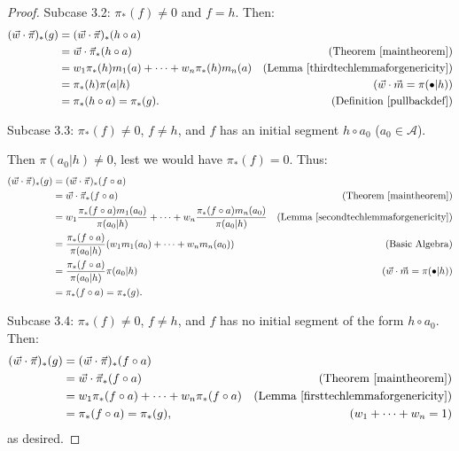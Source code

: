 \documentclass{article}
\begin{document}
\begin{proof}
    Subcase 3.2: $\pi_*(f)\not=0$ and $f=h$. Then:
    \begin{align*}
        (\vec w\cdot\vec\pi)_*(g)
            &= (\vec w\cdot\vec\pi)_*(h\circ a)\\
            &= \vec w\cdot\vec\pi_*(h\circ a)
                    &\mbox{(Theorem \ref{maintheorem})}\\
            &= w_1\pi_*(h)m_1(a)+\cdots+w_n\pi_*(h)m_n(a)
                    &\mbox{(Lemma \ref{thirdtechlemmaforgenericity})}\\
            &= \pi_*(h)\pi(a|h)
                    &\mbox{($\vec w\cdot\vec m=\pi(\bullet|h)$)}\\
            &= \pi_*(h\circ a) = \pi_*(g).
                    &\mbox{(Definition \ref{pullbackdef})}
    \end{align*}

    Subcase 3.3: $\pi_*(f)\not=0$, $f\not=h$, and
    $f$ has an initial segment $h\circ a_0$ ($a_0\in\mathcal A$).

    Then $\pi(a_0|h)\not=0$, lest
    we would have $\pi_*(f)=0$. Thus:
    \begin{align*}
        (\vec w\cdot\vec\pi)_*(g)
            &= (\vec w\cdot \vec\pi)_*(f\circ a)\\
            &= \vec w\cdot\vec\pi_*(f\circ a)
                    &\mbox{(Theorem \ref{maintheorem})}\\
            &= w_1\frac{\pi_*(f\circ a)m_1(a_0)}{\pi(a_0|h)}
                +\cdots+w_n\frac{\pi_*(f\circ a)m_n(a_0)}{\pi(a_0|h)}
                    &\mbox{(Lemma \ref{secondtechlemmaforgenericity})}\\
            &= \frac{\pi_*(f\circ a)}{\pi(a_0|h)}(w_1m_1(a_0)+\cdots+w_nm_n(a_0))
                    &\mbox{(Basic Algebra)}\\
            &= \frac{\pi_*(f\circ a)}{\pi(a_0|h)}\pi(a_0|h)
                    &\mbox{($\vec w\cdot\vec m=\pi(\bullet|h)$)}\\
            &= \pi_*(f\circ a) = \pi_*(g).
    \end{align*}

    Subcase 3.4: $\pi_*(f)\not=0$, $f\not=h$, and $f$ has no initial segment
        of the form $h\circ a_0$. Then:
    \begin{align*}
        (\vec w\cdot\vec\pi)_*(g)
            &= (\vec w\cdot\vec\pi)_*(f\circ a)\\
            &= \vec w\cdot\vec\pi_*(f\circ a)
                    &\mbox{(Theorem \ref{maintheorem})}\\
            &= w_1\pi_*(f\circ a)+\cdots+w_n\pi_*(f\circ a)
                    &\mbox{(Lemma \ref{firsttechlemmaforgenericity})}\\
            &= \pi_*(f\circ a) = \pi_*(g),
                    &\mbox{($w_1+\cdots+w_n=1$)}
    \end{align*}
    as desired.
\end{proof}
\end{document}
